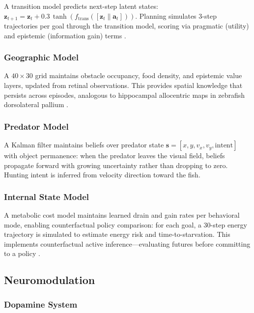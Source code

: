\documentclass[12pt]{article}
\begin{document}
A transition model predicts next-step latent states:
$\mathbf{z}_{t+1} = \mathbf{z}_t + 0.3\,\tanh(f_\text{trans}([\mathbf{z}_t \| \mathbf{a}_t]))$.
Planning simulates 3-step trajectories per goal through the transition
model, scoring via pragmatic (utility) and epistemic (information gain)
terms \citep{friston2017}.

\subsubsection{Geographic Model}

A $40 \times 30$ grid maintains obstacle occupancy, food density,
and epistemic value layers, updated from retinal observations.
This provides spatial knowledge that persists across episodes,
analogous to hippocampal allocentric maps in zebrafish dorsolateral
pallium \citep{broglio2015}.

\subsubsection{Predator Model}

A Kalman filter maintains beliefs over predator state
$\mathbf{s} = [x, y, v_x, v_y, \text{intent}]$ with object
permanence: when the predator leaves the visual field, beliefs
propagate forward with growing uncertainty rather than dropping
to zero.
Hunting intent is inferred from velocity direction toward the fish.

\subsubsection{Internal State Model}

A metabolic cost model maintains learned drain and gain rates per
behavioral mode, enabling counterfactual policy comparison: for each
goal, a 30-step energy trajectory is simulated to estimate energy
risk and time-to-starvation.
This implements counterfactual active inference---evaluating
futures before committing to a policy \citep{seth2016,craig2009}.

\subsection{Neuromodulation}\label{sec:neuromod}

\subsubsection{Dopamine System}
\end{document}
